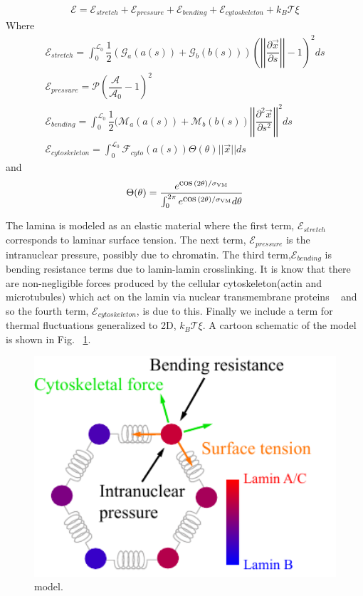 \begin{align}
\mathcal{E} = \mathcal{E}_{stretch} + \mathcal{E}_{pressure} +\mathcal{E}_{bending} + \mathcal{E}_{cytoskeleton} + k_B\mathcal{T} \xi
\end{align}
Where 
\begin{align}
\mathcal{E}_{stretch} = \displaystyle \int_0^{\mathcal{L}_0} \dfrac{1}{2} (\mathcal{G}_a(a(s)) +\mathcal{G}_b(b(s)) )\left( \left |\left| \dfrac{\partial \vec{x} }{\partial s} \right|\right| - 1\right)^2 ds \\
\mathcal{E}_{pressure}  = \mathcal{P} \left( \dfrac{\mathcal{A}}{\mathcal{A}_0} -1\right)^2  \\
\mathcal{E}_{bending} = \displaystyle\int_0^{\mathcal{L}_0} \dfrac{1}{2 } (\mathcal{M}_a(a(s)) + \mathcal{M}_b (b(s)) \left|\left| \dfrac{\partial^2 \vec{x}}{\partial s^2} \right|\right|^2 ds\\
\mathcal{E}_{cytoskeleton} = \displaystyle\int_0^{\mathcal{L}_0} \mathcal{F}_{cyto} (a(s))\Theta (\theta) || \vec{x} || ds 
\end{align}
and \[ \Theta (\theta) = \dfrac{e^{\cos(2\theta)/\sigma_{\rm VM }}}{\int_0^{ 2\pi} e^{\cos(2\theta)/\sigma_{\rm VM}}d \theta} \]

The lamina is modeled as an elastic material where the first term, $\mathcal{E}_{stretch}$ corresponds to laminar surface tension. The next term, $\mathcal{E}_{pressure}$ is the intranuclear pressure, possibly due to chromatin. The third term,$\mathcal{E}_{bending}$  is bending resistance terms due to lamin-lamin crosslinking. It is know that there are non-negligible forces produced by the cellular cytoskeleton(actin and microtubules) which act on the lamin via nuclear transmembrane proteins ~\cite{Haque2010} and so the fourth term, $\mathcal{E}_{cytoskeleton}$, is due to this. Finally we include a term for thermal fluctuations generalized to 2D, $k_B\mathcal{T} \xi$. A cartoon schematic of the model is shown in Fig. ~\ref{fig::model}.

\begin{figure}[h]
\centering
\captionsetup{width=.9\linewidth}
\includegraphics[width=4.5in]{Project3/figs/model_cartoon.pdf}
\caption{model.}
\label{fig::model}
\end{figure}


